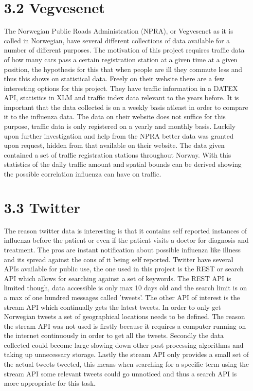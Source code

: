 \documentclass[11pt]{report}
\begin{document}
\section*{3.2 Vegvesenet}
The Norwegian Public Roads Administration (NPRA), or Vegvesenet as it is called in Norwegian, have several different collections of data available for a number of different purposes. The motivation of this project requires traffic data of how many cars pass a certain registration station at a given time at a given position, the hypothesis for this that when people are ill they commute less and thus this shows on statistical data. Freely on their website \cite{vegvesen_for_utviklere} there are a few interesting options for this project. They have traffic information in a DATEX API, statistics in XLM and traffic index data relevant to the years before. It is important that the data collected is on a weekly basis atleast in order to compare it to the influenza data. The data on their website does not suffice for this purpose, traffic data is only registered on a yearly and monthly basis. Luckily upon further investigation and help from the NPRA better data was granted upon request, hidden from that available on their website. The data given contained a set of traffic registration stations throughout Norway. With this statistics of the daily traffic amount and spatial bounds can be derived showing the possible correlation influenza can have on traffic.

\section*{3.3 Twitter}
The reason twitter data is interesting is that it contains self reported instances of influenza before the patient or even if the patient visits a doctor for diagnosis and treatment. The pros are instant notification about possible influenza like illness and its spread against the cons of it being self reported. Twitter have several APIs available for public use, the one used in this project is the REST or search API which allows for searching against a set of keywords. The REST API is limited though, data accessible is only max 10 days old and the search limit is on a max of one hundred messages called 'tweets'. The other API of interest is the stream API which continually gets the latest tweets. In order to only get Norwegian tweets a set of geographical locations needs to be defined. The reason the stream API was not used is firstly because it requires a computer running on the internet continuously in order to get all the tweets. Secondly the data collected could become large slowing down other post-processing algorithms and taking up unnecessary storage. Lastly the stream API only provides a small set of the actual tweets tweeted, this means when searching for a specific term using the stream API some relevant tweets could go unnoticed and thus a search API is more appropriate for this task.
\end{document}

